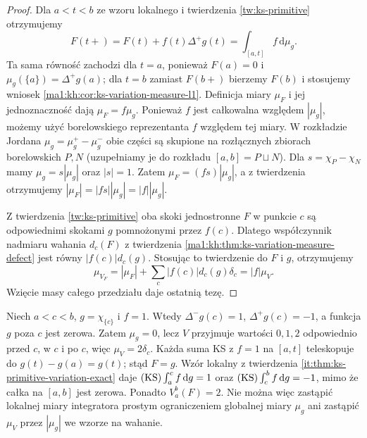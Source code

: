 \begin{proof}
Dla $a<t<b$ ze wzoru lokalnego i twierdzenia
\ref{tw:ks-primitive} otrzymujemy
\[
 F(t+)=F(t)+f(t)\Delta^+g(t)
 =\int_{[a,t]} f\,\mathrm d\mu_g .
\]
Ta sama równość zachodzi dla $t=a$, ponieważ $F(a)=0$
i $\mu_g(\{a\})=\Delta^+g(a)$; dla $t=b$ zamiast
$F(b+)$ bierzemy $F(b)$ i stosujemy wniosek
\ref{ma1:kh:cor:ks-variation-measure-l1}.
Definicja miary $\mu_F$ i jej jednoznaczność dają
$\mu_F=f\mu_g$. Ponieważ $f$ jest całkowalna względem $|\mu_g|$,
możemy użyć borelowskiego reprezentanta $f$ względem
tej miary. W rozkładzie Jordana $\mu_g=\mu_g^+-\mu_g^-$
obie części są skupione na rozłącznych zbiorach
borelowskich $P,N$ (uzupełniamy je do rozkładu
$[a,b]=P\sqcup N$).
Dla $s=\chi_P-\chi_N$ mamy
$\mu_g=s|\mu_g|$ oraz $|s|=1$.
Zatem $\mu_F=(fs)|\mu_g|$, a z twierdzenia
otrzymujemy $|\mu_F|=|fs||\mu_g|=|f||\mu_g|$.

Z twierdzenia \ref{tw:ks-primitive} oba skoki jednostronne
$F$ w punkcie $c$ są odpowiednimi skokami $g$
pomnożonymi przez $f(c)$. Dlatego współczynnik nadmiaru
wahania $d_c(F)$ z twierdzenia
\ref{ma1:kh:thm:ks-variation-measure-defect} jest równy
$|f(c)|d_c(g)$. Stosując to twierdzenie do $F$ i $g$,
otrzymujemy
\[
 \mu_{V_F}=|\mu_F|+\sum_c |f(c)|d_c(g)\delta_c
 =|f|\mu_V .
\]
Wzięcie masy całego przedziału daje ostatnią tezę.
\end{proof}

\begin{przyklad}
\label{it:ex:ks-local-cancelled-atom}
Niech $a<c<b$, $g=\chi_{\{c\}}$ i $f=1$.
Wtedy $\Delta^-g(c)=1$, $\Delta^+g(c)=-1$,
a funkcja $g$ poza $c$ jest zerowa. Zatem $\mu_g=0$,
lecz $V$ przyjmuje wartości $0,1,2$ odpowiednio przed
$c$, w $c$ i po $c$, więc $\mu_V=2\delta_c$.
Każda suma KS z $f=1$ na $[a,t]$ teleskopuje do
$g(t)-g(a)=g(t)$; stąd $F=g$.
Wzór lokalny z twierdzenia \ref{it:thm:ks-primitive-variation-exact}
daje $(\mathrm{KS})\int_a^c f\,\mathrm dg=1$ oraz
$(\mathrm{KS})\int_c^b f\,\mathrm dg=-1$, mimo że całka na
$[a,b]$ jest zerowa. Ponadto $V_a^b(F)=2$.
Nie można więc zastąpić lokalnej miary integratora
prostym ograniczeniem globalnej miary $\mu_g$
ani zastąpić $\mu_V$ przez $|\mu_g|$ we wzorze na wahanie.
\end{przyklad}

